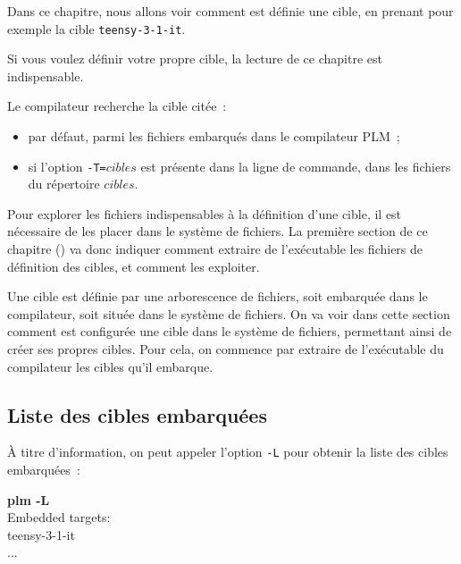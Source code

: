 





Dans ce chapitre, nous allons voir comment est définie une cible, en prenant pour exemple la cible \texttt{teensy-3-1-it}. 

Si vous voulez définir votre propre cible, la lecture de ce chapitre est indispensable. 

Le compilateur recherche la cible citée~:
\begin{itemize}
  \item par défaut, parmi les fichiers embarqués dans le compilateur PLM~;
  \item si l'option \texttt{-T=$cibles$} est présente dans la ligne de commande, dans les fichiers du répertoire $cibles$.
\end{itemize}

Pour explorer les fichiers indispensables à la définition d'une cible, il est nécessaire de les placer dans le système de fichiers. La première section de ce chapitre () va donc indiquer comment extraire de l'exécutable les fichiers de définition des cibles, et comment les exploiter.



Une cible est définie par une arborescence de fichiers, soit embarquée dans le compilateur, soit située dans le système de fichiers. On va voir dans cette section comment est configurée une cible dans le système de fichiers, permettant ainsi de créer ses propres cibles. Pour cela, on commence par extraire de l'exécutable du compilateur les cibles qu'il embarque.

\subsection{Liste des cibles embarquées}
À titre d'information, on peut appeler l'option \texttt{-L} pour obtenir la liste des cibles embarquées~:
\begin{SHELL}
{\bfseries plm -L}\\
Embedded targets:\\ 
\hspace*{1.2em}teensy-3-1-it\\
\hspace*{1.2em}...
\end{SHELL}

